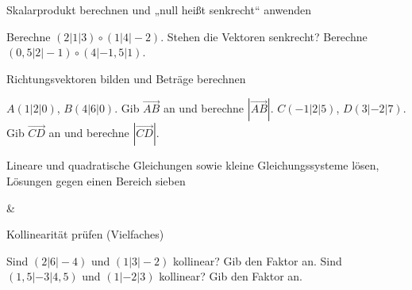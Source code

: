 \setcounter{aufgabe}{0}

\begin{aufgabe}{Skalarprodukt berechnen und „null heißt senkrecht“ anwenden}
\begin{teile}
\teil Berechne $(2 | 1 | 3) \circ (1 | 4 | -2)$. Stehen die Vektoren senkrecht? \leerfeld
\teil Berechne $(0{,}5 | 2 | -1) \circ (4 | -1{,}5 | 1)$. \leerfeld
\end{teile}
\end{aufgabe}

\begin{aufgabe}{Richtungsvektoren bilden und Beträge berechnen}
\begin{teile}
\teil $A(1 | 2 | 0)$, $B(4 | 6 | 0)$. Gib $\overrightarrow{AB}$ an und berechne $|\overrightarrow{AB}|$. \leerfeld
\teil $C(-1 | 2 | 5)$, $D(3 | -2 | 7)$. Gib $\overrightarrow{CD}$ an und berechne $|\overrightarrow{CD}|$. \leerfeld
\end{teile}
\end{aufgabe}

\begin{aufgabe}{Lineare und quadratische Gleichungen sowie kleine Gleichungssysteme lösen, Lösungen gegen einen Bereich sieben}
\begin{gleichungsraster}[2]
 &
 \\
\end{gleichungsraster}
\end{aufgabe}

\begin{aufgabe}{Kollinearität prüfen (Vielfaches)}
\begin{teile}
\teil Sind $(2 | 6 | -4)$ und $(1 | 3 | -2)$ kollinear? Gib den Faktor an. \leerfeld
\teil Sind $(1{,}5 | -3 | 4{,}5)$ und $(1 | -2 | 3)$ kollinear? Gib den Faktor an. \leerfeld
\end{teile}
\end{aufgabe}

